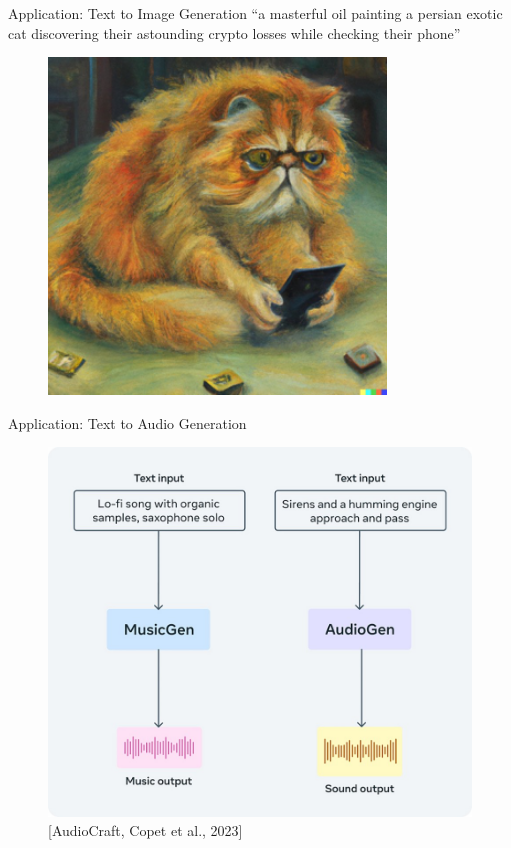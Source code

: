 \begin{frame}{Application: Text to Image Generation}
    \centering
    “a masterful oil painting a persian exotic cat discovering their astounding crypto losses while checking their phone”
    \begin{figure}
    \centering
    \includegraphics[width=0.8\textwidth,height=0.75\textheight,keepaspectratio]{images/dul/slide_29_1_img.png}
    \end{figure}
\end{frame}

\begin{frame}[allowframebreaks]{Application: Text to Audio Generation}
    \begin{figure}
    \centering
    \includegraphics[height=0.8\textheight]{images/dul/slide_34_1_img.png}
    \caption{[AudioCraft, Copet et al., 2023]}
    \end{figure}
\end{frame}

